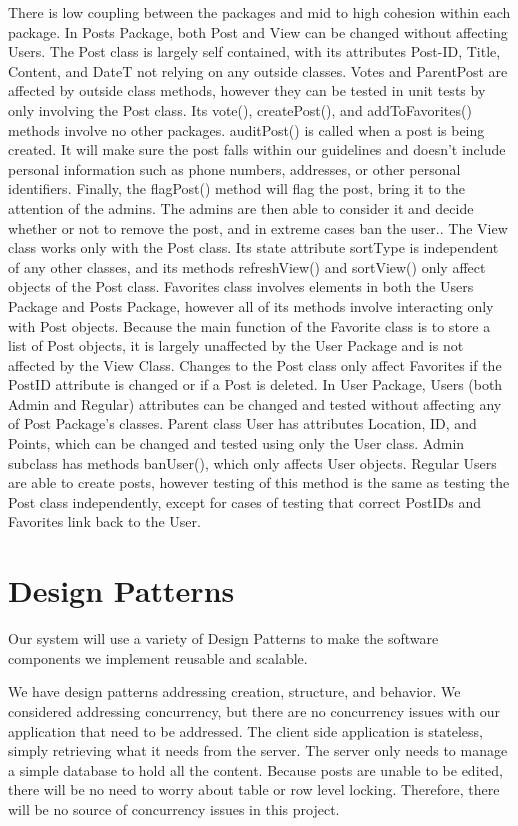\documentclass[12pt]{article}
\begin{document}
There is low coupling between the packages and mid to high cohesion within each package.
In Posts Package, both Post and View can be changed without affecting Users. The Post class is largely self contained, with its attributes Post-ID, Title, Content, and DateT not relying on any outside classes. Votes and ParentPost are affected by outside class methods, however they can be tested in unit tests by only involving the Post class. Its vote(), createPost(), and addToFavorites() methods involve no other packages. auditPost() is called when a post is being created.  It will make sure the post falls within our guidelines and doesn't include personal information such as phone numbers, addresses, or other personal identifiers.  Finally, the flagPost() method will flag the post, bring it to the attention of the admins.  The admins are then able to consider it and decide whether or not to remove the post, and in extreme cases ban the user.. The View class works only with the Post class. Its state attribute sortType is independent of any other classes, and its methods refreshView() and sortView() only affect objects of the Post class. Favorites class involves elements in both the Users Package and Posts Package, however all of its methods involve interacting only with Post objects. Because the main function of the Favorite class is to store a list of Post objects, it is largely unaffected by the User Package and is not affected by the View Class. Changes to the Post class only affect Favorites if the PostID attribute is changed or if a Post is deleted.
In User Package, Users (both Admin and Regular) attributes can be changed and tested without affecting any of Post Package’s classes. Parent class User has attributes Location, ID, and Points, which can be changed and tested using only the User class. Admin subclass has methods banUser(), which only affects User objects. Regular Users are able to create posts, however testing of this method is the same as testing the Post class independently, except for cases of testing that correct PostIDs and Favorites link back to the User.

\section{Design Patterns}
Our system will use a variety of Design Patterns to make the software components we implement reusable and scalable.

We have design patterns addressing creation, structure, and behavior. We considered addressing concurrency, but there are no concurrency issues with our application that need to be addressed.  The client side application is stateless, simply retrieving what it needs from the server.  The server only needs to manage a simple database to hold all the content.  Because posts are unable to be edited, there will be no need to worry about table or row level locking.  Therefore, there will be no source of concurrency issues in this project.
\end{document}
